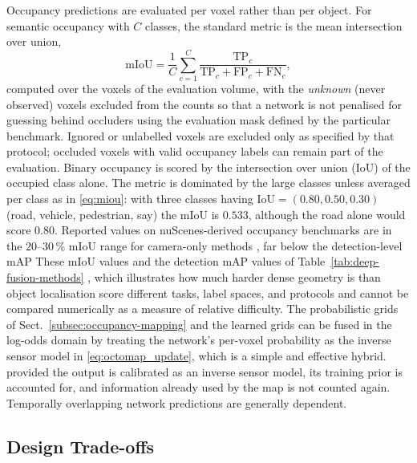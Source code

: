 \documentclass[graybox,envcountchap]{style/SNmono}
\providecommand{\DIFadd}[1]{{\protect\color{blue} #1}} %
\providecommand{\DIFdel}[1]{{\protect\color{red} #1}} %
\providecommand{\DIFaddbegin}{} %
\providecommand{\DIFaddend}{} %
\providecommand{\DIFdelbegin}{} %
\providecommand{\DIFdelend}{} %
\begin{document}
Occupancy predictions are evaluated per voxel rather than per object. For semantic occupancy with $C$ classes, the standard metric is the mean intersection over union,
\begin{equation}
\mathrm{mIoU}=\frac{1}{C}\sum_{c=1}^{C}\frac{\mathrm{TP}_c}{\mathrm{TP}_c+\mathrm{FP}_c+\mathrm{FN}_c},
\label{eq:miou}
\end{equation}
computed over the voxels of the evaluation volume, \DIFdelbegin \DIFdel{with the }\emph{\DIFdel{unknown}} %
\DIFdel{(never observed) voxels excluded from the counts so that a network is not penalised for guessing behind occluders}\DIFdelend \DIFaddbegin \DIFadd{using the evaluation mask defined by the particular benchmark. Ignored or unlabelled voxels are excluded only as specified by that protocol; occluded voxels with valid occupancy labels can remain part of the evaluation}\DIFaddend . Binary occupancy is scored by the intersection over union (IoU) of the occupied class alone. The metric is dominated by the large classes unless averaged per class as in \eqref{eq:miou}: with three classes having $\mathrm{IoU}=(0.80,0.50,0.30)$ (road, vehicle, pedestrian, say) the mIoU is $0.533$, although the road alone would score $0.80$. Reported values on nuScenes-derived occupancy benchmarks are in the $20$--$30\,\%$ mIoU range for camera-only methods \cite{wei2023_surroundocc,huang2023_tpvformer}, \DIFdelbegin \DIFdel{far below the detection-level mAP }\DIFdelend \DIFaddbegin \DIFadd{These mIoU values and the detection mAP values }\DIFaddend of Table~\ref{tab:deep-fusion-methods} \DIFdelbegin \DIFdel{, which illustrates how much harder dense geometry is than object localisation}\DIFdelend \DIFaddbegin \DIFadd{score different tasks, label spaces, and protocols and cannot be compared numerically as a measure of relative difficulty}\DIFaddend . The probabilistic grids of Sect.~\ref{subsec:occupancy-mapping} and the learned grids can be fused in the log-odds domain by treating the network's per-voxel probability as the inverse sensor model in \eqref{eq:octomap_update}, \DIFdelbegin \DIFdel{which is a simple and effective hybrid. }\DIFdelend \DIFaddbegin \DIFadd{provided the output is calibrated as an inverse sensor model, its training prior is accounted for, and information already used by the map is not counted again. Temporally overlapping network predictions are generally dependent.
}\DIFaddend 

\subsection{Design Trade-offs}
\end{document}
